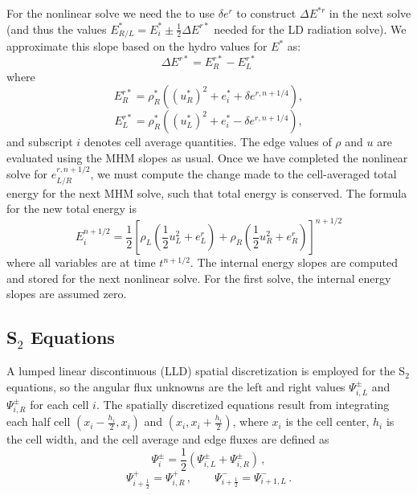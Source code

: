 \documentclass[preprint,12pt]{elsarticle}
\newcommand{\fn}[1]{\left( #1 \right)}
\newcommand{\pec}{\, ,}
\newcommand{\pep}{\, .}
\newcommand{\half}{\frac{1}{2}}
\begin{document}
For the nonlinear solve we need the to use $\delta e^r$ to construct
$\Delta E^{*r}$ in the next solve (and thus the values $E^*_{R/L} = E^*_i \pm \frac{1}{2}\Delta E^{r*}$
needed for the LD radiation solve).  We approximate this slope based on the hydro values
for $E^*$ as:
\begin{equation}
    \Delta E^{r*} = E^{r*}_R - E^{r*}_L
\end{equation}
where 
\begin{equation}\label{estarr}
    E^{r*}_R = \rho^*_R\left((u_R^*)^2 + e^*_i +
    \delta e^{r,n+1/4}\right),
\end{equation}
\begin{equation}\label{estarl}
    E^{r*}_L = \rho^*_R\left((u_L^*)^2 + e^*_i -
    \delta e^{r,n+1/4}\right),
\end{equation}
and subscript $i$ denotes cell average quantities.  The edge values of $\rho$ and
$u$ are evaluated using the MHM slopes as usual.
 Once we have completed
the nonlinear solve for $e^{r,n+1/2}_{L/R}$, we must compute the change made to the
cell-averaged total energy for the next MHM solve, such that total energy is conserved. The formula for the new total energy is
\begin{equation}\label{ei}
    E^{n+1/2}_i = \frac{1}{2}\left[\rho_L\left(\frac{1}{2}u_L^2 + e_L^r\right)
    +\rho_R\left(\frac{1}{2}u_R^2 + e_R^r\right)\right]^{n+1/2}
\end{equation}
where all variables are at time $t^{n+1/2}$. The internal energy slopes are computed
and stored for the next nonlinear solve.  For the first solve, the internal energy
slopes are assumed zero.


\subsection{\texorpdfstring{S$_2$}{S-2} Equations}

A lumped linear discontinuous (LLD) spatial discretization is employed
for the S$_2$ equations, so the angular flux
unknowns are the left and right values $\Psi_{i,L}^\pm$ and
$\Psi_{i,R}^\pm$ for each cell $i$. The spatially
discretized equations result from integrating each half cell
$(x_i-\frac{h_i}{2},x_i)$ and $(x_i,x_i+\frac{h_i}{2})$,
where $x_i$ is the cell center, $h_i$ is the cell width,
and the cell average and edge fluxes are defined as
\begin{equation}
  \Psi_i^\pm=\half\fn{\Psi_{i,L}^\pm + \Psi_{i,R}^\pm} \pec
\end{equation}
\begin{equation}
  \Psi_{i+\half}^+=\Psi_{i,R}^+ \pec\qquad \Psi_{i+\half}^-=\Psi_{i+1,L}^- \pep
\end{equation}
\end{document}
